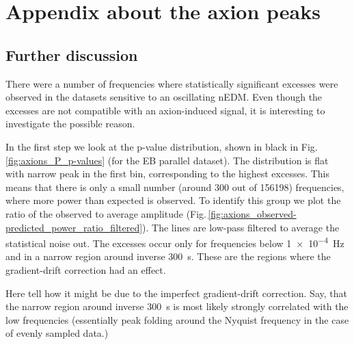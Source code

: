\chapter{Appendix about the axion peaks}
\label{ch:alp_appendix}

\section{Further discussion}
There were a number of frequencies where statistically significant excesses were observed in the datasets sensitive to an oscillating nEDM.
Even though the excesses are not compatible with an axion-induced signal, it is interesting to investigate the possible reason.

In the first step we look at the p-value distribution, shown in black in Fig.\,\ref{fig:axions_P_p-values} (for the EB parallel dataset).
The distribution is flat with narrow peak in the first bin, corresponding to the highest excesses.
This means that there is only a small number (around 300 out of \num[detect-all=true]{156198}) frequencies, where more power than expected is observed.
To identify this group we plot the ratio of the observed to average amplitude (Fig.\,\ref{fig:axions_observed-predicted_power_ratio_filtered}). The lines are low-pass filtered to average the statistical noise out. The excesses occur only for frequencies below \SI{1e-4}{\hertz} and in a narrow region around inverse \SI{300}{\second}. These are the regions where the gradient-drift correction had an effect.

Here tell how it might be due to the imperfect gradient-drift correction. Say, that the narrow region around inverse \SI{300}{\second} is most likely strongly correlated with the low frequencies (essentially peak folding around the Nyquist frequency in the case of evenly sampled data.)


